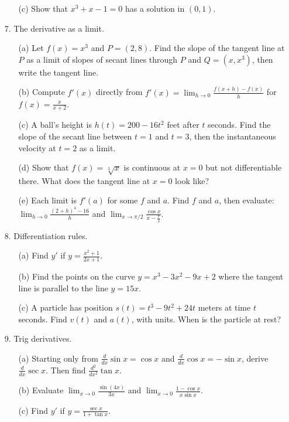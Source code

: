 \documentclass[12pt]{article}
\begin{document}
\begin{enumerate}
\begin{enumerate}
\item[(c)] Show that $x^3 + x - 1 = 0$ has a solution in $(0,1)$.
\end{enumerate}
\item[7.] The derivative as a limit.
\begin{enumerate}
\item[(a)] Let $f(x) = x^3$ and $P = (2,8)$. Find the slope of the tangent line at $P$ as a limit of slopes of secant lines through $P$ and $Q = (x, x^3)$, then write the tangent line.
\item[(b)] Compute $f'(x)$ directly from $f'(x) = \lim_{h \to 0} \frac{f(x+h)-f(x)}{h}$ for $f(x) = \frac{x}{x+2}$.
\item[(c)] A ball's height is $h(t) = 200 - 16t^2$ feet after $t$ seconds. Find the slope of the secant line between $t=1$ and $t=3$, then the instantaneous velocity at $t=2$ as a limit.
\item[(d)] Show that $f(x) = \sqrt[3]{x}$ is continuous at $x=0$ but not differentiable there. What does the tangent line at $x=0$ look like?
\item[(e)] Each limit is $f'(a)$ for some $f$ and $a$. Find $f$ and $a$, then evaluate: $\lim_{h \to 0} \frac{(2+h)^4 - 16}{h}$ and $\lim_{x \to \pi/2} \frac{\cos x}{x - \frac{\pi}{2}}$.
\end{enumerate}
\item[8.] Differentiation rules.
\begin{enumerate}
\item[(a)] Find $y'$ if $y = \frac{x^2+1}{2x+1}$.
\item[(b)] Find the points on the curve $y = x^3 - 3x^2 - 9x + 2$ where the tangent line is parallel to the line $y = 15x$.
\item[(c)] A particle has position $s(t) = t^3 - 9t^2 + 24t$ meters at time $t$ seconds. Find $v(t)$ and $a(t)$, with units. When is the particle at rest?
\end{enumerate}
\item[9.] Trig derivatives.
\begin{enumerate}
\item[(a)] Starting only from $\frac{d}{dx}\sin x = \cos x$ and $\frac{d}{dx}\cos x = -\sin x$, derive $\frac{d}{dx}\sec x$. Then find $\frac{d^2}{dx^2}\tan x$.
\item[(b)] Evaluate $\lim_{x \to 0} \frac{\sin(4x)}{3x}$ and $\lim_{x \to 0} \frac{1-\cos x}{x\sin x}$.
\item[(c)] Find $y'$ if $y = \frac{\sec x}{1 + \tan x}$.
\end{enumerate}

\end{enumerate}
\end{document}
